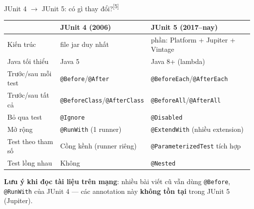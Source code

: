\documentclass[aspectratio=169,12pt]{beamer}
\newcommand{\sref}[1]{\textsuperscript{\scriptsize[#1]}}
\begin{document}
\begin{frame}{JUnit 4 \(\to\) JUnit 5: có gì thay đổi?\sref{5}}
  \footnotesize
  \renewcommand{\arraystretch}{1.05}
  \setlength{\tabcolsep}{4pt}
  \begin{tabularx}{\textwidth}{l>{\raggedright\arraybackslash}X>{\raggedright\arraybackslash}X}
    \toprule
    & \textbf{JUnit 4 (2006)} & \textbf{JUnit 5 (2017--nay)} \\
    \midrule
    Kiến trúc & 1 file jar duy nhất & 3 phần: Platform + Jupiter + Vintage \\
    Java tối thiểu & Java 5 & Java 8+ (lambda) \\
    Trước/sau mỗi test & \texttt{@Before}/\allowbreak\texttt{@After} & \texttt{@BeforeEach}/\allowbreak\texttt{@AfterEach} \\
    Trước/sau tất cả & \texttt{@BeforeClass}/\allowbreak\texttt{@AfterClass} & \texttt{@BeforeAll}/\allowbreak\texttt{@AfterAll} \\
    Bỏ qua test & \texttt{@Ignore} & \texttt{@Disabled} \\
    Mở rộng & \texttt{@RunWith} (1 runner) & \texttt{@ExtendWith} (nhiều extension) \\
    Test theo tham số & Cồng kềnh (runner riêng) & \texttt{@ParameterizedTest} tích hợp \\
    Test lồng nhau & Không & \texttt{@Nested} \\
    \bottomrule
  \end{tabularx}
  \renewcommand{\arraystretch}{1}

  \vspace{0.3em}
  {\small \textbf{Lưu ý khi đọc tài liệu trên mạng}: nhiều bài viết cũ vẫn dùng
  \texttt{@Before}, \texttt{@RunWith} của JUnit 4 --- các annotation này
  \textbf{không tồn tại} trong JUnit 5 (Jupiter).}
\end{frame}
\end{document}
